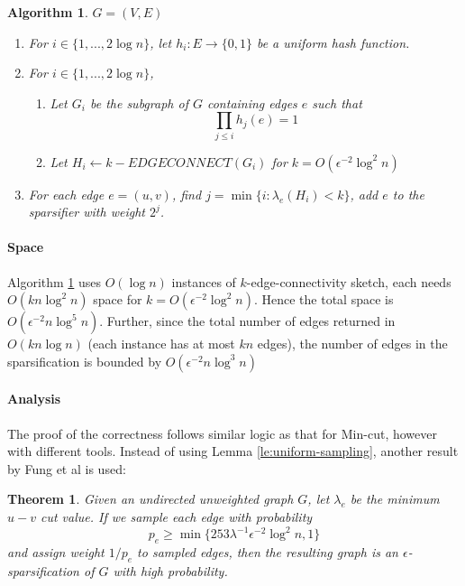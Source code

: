 \documentclass[11pt]{article}
\theoremstyle{plain}
\newtheorem{theorem}{Theorem}[section]
\newtheorem{algorithm}{Algorithm}[section]
\begin{document}
\begin{algorithm}
	\label{al:sparsification}
	$G=(V, E)$
	\begin{enumerate}
		\item For $i \in \{1, . . . , 2 \log n\}$, let $h_i : E\rightarrow \{0, 1\}$ be a 
		uniform hash function.
		\item For $i \in \{1, . . . , 2 \log n\}$,\begin{enumerate}
			\item Let $G_i$ be the subgraph of $G$ containing edges $e$ such 
			that 
			\[
			\prod_{j\leq i}h_j(e)=1
			\]
			\item Let $H_i\leftarrow k-EDGECONNECT(G_i)$ for 
			$k=O(\epsilon^{-2}\log^2 n)$
		\end{enumerate}
		\item For each edge $e=(u,v)$, find $j=\min\{i : \lambda_e(H_i) < k\}$, 
		add $e$ to the sparsifier with weight $2^j$. 
	\end{enumerate}
\end{algorithm}

\paragraph{Space} Algorithm \ref{al:sparsification} uses $O(\log n)$ 
instances of $k$-edge-connectivity sketch, each needs $O(kn\log^2 
n)$ space for $k=O(\epsilon^{-2}\log^2 n)$. Hence the total space is 
$O(\epsilon^{-2}n\log^5 n)$. Further, since the total number of edges 
returned in $O(kn\log n)$ (each instance has at most $kn$ edges), the 
number of edges in the sparsification is bounded by $O(\epsilon^{-2}n\log^3 
n)$

\paragraph{Analysis} The proof of the correctness follows similar logic as 
that for Min-cut, however with different tools. Instead of using Lemma 
\ref{le:uniform-sampling}, another result by Fung et al \cite{Fung11} is used: 

\begin{theorem}
Given an undirected unweighted graph $G$, let $\lambda_e$ be the minimum 
$u-v$ cut value. If we sample each edge with probability
\[
p_e\geq \min\{253\lambda^{-1}\epsilon^{-2}\log^2 n,1\}
\]
and assign weight $1/p_e$ to sampled edges, then the resulting graph
is an $\epsilon$-sparsification of $G$ with high probability.
\end{theorem}
\end{document}

